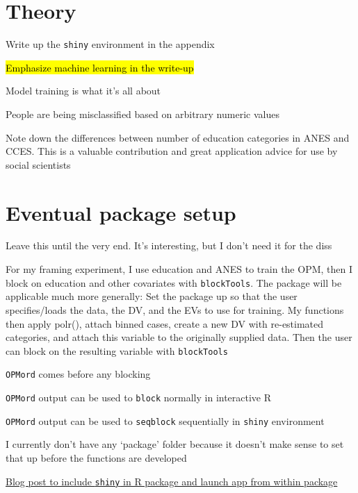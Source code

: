 	
\section*{Theory}
	\begin{coi}
		\item Write up the \texttt{shiny} environment in the appendix
		\item \hl{Emphasize machine learning in the write-up}
			\begin{coi}
				\item Model training is what it's all about
				\item People are being misclassified based on arbitrary numeric values
			\end{coi}
		\item Note down the differences between number of education categories in ANES and CCES. This is a valuable contribution and great application advice for use by social scientists
	\end{coi}

	
	
\section*{Eventual package setup}
	\begin{coi}
		\item Leave this until the very end. It's interesting, but I don't need it for the diss
		\item For my framing experiment, I use education and ANES to train the OPM, then I block on education and other covariates with \texttt{blockTools}. The package will be applicable much more generally: Set the package up so that the user specifies/loads the data, the DV, and the EVs to use for training. My functions then apply polr(), attach binned cases, create a new DV with re-estimated categories, and attach this variable to the originally supplied data. Then the user can block on the resulting variable with \texttt{blockTools}
			\begin{coi}
				\item \texttt{OPMord} comes before any blocking
				\item \texttt{OPMord} output can be used to \texttt{block} normally in interactive R
				\item \texttt{OPMord} output can be used to \texttt{seqblock} sequentially in \texttt{shiny} environment
			\end{coi}
		\item I currently don't have any `package' folder because it doesn't make sense to set that up before the functions are developed
		\item \href{https://deanattali.com/2015/04/21/r-package-shiny-app/}{Blog post to include {\tt shiny} in R package and launch app from within package}
	\end{coi}	
	
	
	



